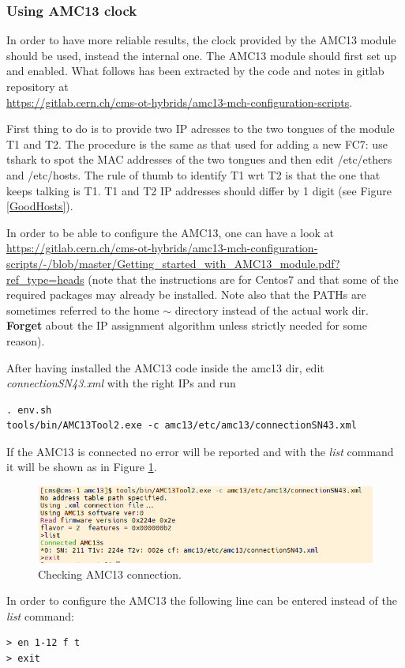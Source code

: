 \documentclass[10pt,a4paper]{article}
\begin{document}
\subsubsection{Using AMC13 clock}
In order to have more reliable results, the clock provided by the AMC13 module should be used, instead the internal one.
The AMC13 module should first set up and enabled. What follows has been extracted by the code and notes in gitlab repository at\\ \url{https://gitlab.cern.ch/cms-ot-hybrids/amc13-mch-configuration-scripts}.

First thing to do is to provide two IP adresses to the two tongues of the module T1 and T2. The procedure is the same as that used for adding a new FC7: use tshark to spot the MAC addresses of the two tongues and then edit /etc/ethers and /etc/hosts. The rule of thumb to identify T1 wrt T2 is that the one that keeps talking is T1. T1 and T2 IP addresses should differ by 1 digit (see Figure \ref{GoodHosts}).

In order to be able to configure the AMC13, one can have a look at \\
\url{https://gitlab.cern.ch/cms-ot-hybrids/amc13-mch-configuration-scripts/-/blob/master/Getting_started_with_AMC13_module.pdf?ref_type=heads} 
 (note that the instructions are for Centos7 and that some of the required packages may already be installed. Note also that the PATHs are sometimes referred to the home $\sim$ directory instead of the actual work dir. {\bf Forget} about the IP assignment algorithm unless strictly needed for some reason). 

After having installed the AMC13 code inside the amc13 dir, edit {\it connectionSN43.xml} with the right IPs and run 
\begin{framed}
\begin{verbatim}
. env.sh
tools/bin/AMC13Tool2.exe -c amc13/etc/amc13/connectionSN43.xml
\end{verbatim}
\end{framed}
If the AMC13 is connected no error will be reported and with the {\it list} command it will be shown as in Figure \ref{amc13connected}.
\begin{figure}[h!]
\centering
 \includegraphics[width=\linewidth]{amc13connected.png} 
  \caption{Checking AMC13 connection.}
\label{amc13connected}
\end{figure}
In order to configure the AMC13 the following line can be entered instead of the {\it list} command:
\begin{framed}
\begin{verbatim}
> en 1-12 f t
> exit
\end{verbatim}
\end{framed}
\end{document}
